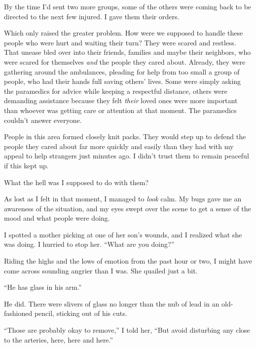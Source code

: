 By the time I'd sent two more groups, some of the others were coming back to be directed to the next few injured.  I gave them their orders.



Which only raised the greater problem.  How were we supposed to handle these people who were hurt and waiting their turn?  They were scared and restless.  That unease bled over into their friends, families and maybe their neighbors, who were scared for themselves \emph{and} the people they cared about.  Already, they were gathering around the ambulances, pleading for help from too small a group of people, who had their hands full saving others' lives.  Some were simply asking the paramedics for advice while keeping a respectful distance, others were demanding assistance because they felt \emph{their} loved ones were more important than whoever was getting care or attention at that moment.  The paramedics couldn't answer everyone.



People in this area formed closely knit packs.  They would step up to defend the people they cared about far more quickly and easily than they had with my appeal to help strangers just minutes ago.  I didn't trust them to remain peaceful if this kept up.



What the hell was I supposed to do with them?



As lost as I felt in that moment, I managed to \emph{look} calm.  My bugs gave me an awareness of the situation, and my eyes swept over the scene to get a sense of the mood and what people were doing.



I spotted a mother picking at one of her son's wounds, and I realized what she was doing.  I hurried to stop her.  ``What are you doing?''



Riding the highs and the lows of emotion from the past hour or two, I might have come across sounding angrier than I was.  She quailed just a bit.



``He has glass in his arm.''



He did.  There were slivers of glass no longer than the nub of lead in an old-fashioned pencil, sticking out of his cuts.



``Those are probably okay to remove,'' I told her, ``But avoid disturbing any close to the arteries, here, here and here.''



